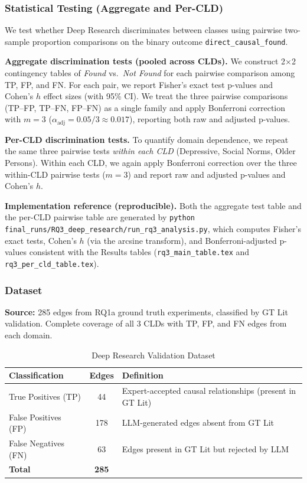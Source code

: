 \subsubsection{Statistical Testing (Aggregate and Per-CLD)}

We test whether Deep Research discriminates between classes using pairwise two-sample proportion comparisons on the binary outcome \texttt{direct\_causal\_found}.

\textbf{Aggregate discrimination tests (pooled across CLDs).} We construct 2$\times$2 contingency tables of \textit{Found} vs.\ \textit{Not Found} for each pairwise comparison among TP, FP, and FN. For each pair, we report Fisher's exact test p-values and Cohen's $h$ effect sizes (with 95\% CI). We treat the three pairwise comparisons (TP--FP, TP--FN, FP--FN) as a single family and apply Bonferroni correction with $m=3$ ($\alpha_{\text{adj}}=0.05/3 \approx 0.017$), reporting both raw and adjusted p-values.

\textbf{Per-CLD discrimination tests.} To quantify domain dependence, we repeat the same three pairwise tests \textit{within each CLD} (Depressive, Social Norms, Older Persons). Within each CLD, we again apply Bonferroni correction over the three within-CLD pairwise tests ($m=3$) and report raw and adjusted p-values and Cohen's $h$.

\textbf{Implementation reference (reproducible).} Both the aggregate test table and the per-CLD pairwise table are generated by \texttt{python final\_runs/RQ3\_deep\_research/run\_rq3\_analysis.py}, which computes Fisher's exact tests, Cohen's $h$ (via the arcsine transform), and Bonferroni-adjusted p-values consistent with the Results tables (\texttt{rq3\_main\_table.tex} and \texttt{rq3\_per\_cld\_table.tex}).

\subsubsection{Dataset}

\textbf{Source:} 285 edges from RQ1a ground truth experiments, classified by GT Lit validation. Complete coverage of all 3 CLDs with TP, FP, and FN edges from each domain.

\begin{table}[H]
\centering
\caption{Deep Research Validation Dataset}
\label{tab:dr_dataset}
\footnotesize
\begin{tabular}{@{}l c l@{}}
\toprule
\textbf{Classification} & \textbf{Edges} & \textbf{Definition} \\
\midrule
True Positives (TP) & 44 & Expert-accepted causal relationships (present in GT Lit) \\
False Positives (FP) & 178 & LLM-generated edges absent from GT Lit \\
False Negatives (FN) & 63 & Edges present in GT Lit but rejected by LLM \\
\midrule
\textbf{Total} & \textbf{285} & \\
\bottomrule
\end{tabular}
\end{table}

